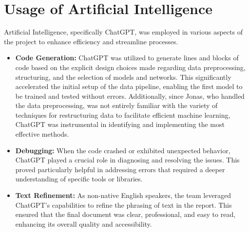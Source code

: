 \documentclass[8pt,a4paper]{article}
\begin{document}
\section{Usage of Artificial Intelligence}
Artificial Intelligence, specifically ChatGPT, was employed in various aspects of the project to enhance efficiency and streamline processes.

\begin{itemize}
\item \textbf{Code Generation:} ChatGPT was utilized to generate lines and blocks of code based on the explicit design choices made regarding data preprocessing, structuring, and the selection of models and networks. This significantly accelerated the initial setup of the data pipeline, enabling the first model to be trained and tested without errors. Additionally, since Jonas, who handled the data preprocessing, was not entirely familiar with the variety of techniques for restructuring data to facilitate efficient machine learning, ChatGPT was instrumental in identifying and implementing the most effective methods.

\item \textbf{Debugging:} When the code crashed or exhibited unexpected behavior, ChatGPT played a crucial role in diagnosing and resolving the issues. This proved particularly helpful in addressing errors that required a deeper understanding of specific tools or libraries.

\item \textbf{Text Refinement:} As non-native English speakers, the team leveraged ChatGPT's capabilities to refine the phrasing of text in the report. This ensured that the final document was clear, professional, and easy to read, enhancing its overall quality and accessibility.
\end{itemize}
\end{document}
